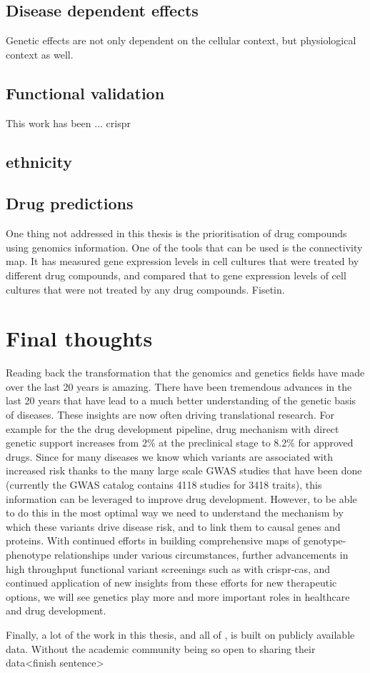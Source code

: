 \subsection{Disease dependent effects}
Genetic effects are not only dependent on the cellular context, but physiological context as well. 

\subsection{Functional validation}
This work has been ... crispr

\subsection{ethnicity}

\subsection{Drug predictions}
One thing not addressed in this thesis is the prioritisation of drug compounds using genomics information. One of the tools that can be used is the connectivity map\cite{lambConnectivityMapUsing2006}. It has measured gene expression levels in cell cultures that were treated by different drug compounds, and compared that to gene expression levels of cell cultures that were not treated by any drug compounds. Fisetin\cite{gibbsHumanGenomeProject2020}.

\section{Final thoughts}
Reading back the transformation that the genomics and genetics fields have made over the last 20 years is amazing. There have been tremendous advances in the last 20 years that have lead to a much better understanding of the genetic basis of diseases. These insights are now often driving translational research. For example for the the drug development pipeline, drug mechanism with direct genetic support increases from 2\% at the preclinical stage to 8.2\% for approved drugs\cite{nelsonSupportHumanGenetic2015d}. Since for many diseases we know which variants are associated with increased risk thanks to the many large scale GWAS studies that have been done (currently the GWAS catalog\cite{macarthurNewNHGRIEBICatalog2017a} contains 4118 studies for 3418 traits), this information can be leveraged to improve drug development. However, to be able to do this in the most optimal way we need to understand the mechanism by which these variants drive disease risk, and to link them to causal genes and proteins.
 With continued efforts in building comprehensive maps of genotype-phenotype relationships under various circumstances, further advancements in high throughput functional variant screenings such as with crispr-cas, and continued application of new insights from these efforts for new therapeutic options, we will see genetics play more and more important roles in healthcare and drug development. 

Finally, a lot of the work in this thesis, and all of , is built on publicly available data. Without the academic community being so open to sharing their data<finish sentence> 
